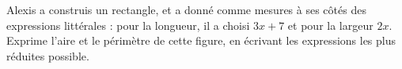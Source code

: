 %
%
	Alexis a construis un rectangle, et a donné comme mesures à ses côtés des expressions littérales : pour la longueur, il a choisi \(3x + 7\) et pour la largeur \(2x\). \\
	Exprime l'aire et le périmètre de cette figure, en écrivant les expressions les plus réduites possible.
